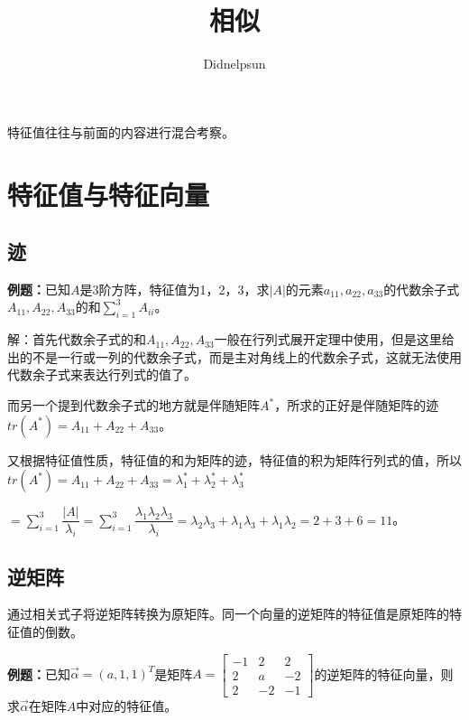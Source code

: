 \documentclass[UTF8, 12pt]{ctexart}
\author{Didnelpsun}
\title{相似}
\date{}
\begin{document}
\maketitle
\pagestyle{empty}
\thispagestyle{empty}
\tableofcontents
\thispagestyle{empty}
\newpage
\pagestyle{plain}
\setcounter{page}{1}

特征值往往与前面的内容进行混合考察。

\section{特征值与特征向量}

\subsection{迹}

\textbf{例题：}已知$A$是3阶方阵，特征值为1，2，3，求$\vert A\vert$的元素$a_{11},a_{22},a_{33}$的代数余子式$A_{11},A_{22},A_{33}$的和$\sum\limits_{i=1}^3A_{ii}$。

解：首先代数余子式的和$A_{11},A_{22},A_{33}$一般在行列式展开定理中使用，但是这里给出的不是一行或一列的代数余子式，而是主对角线上的代数余子式，这就无法使用代数余子式来表达行列式的值了。

而另一个提到代数余子式的地方就是伴随矩阵$A^*$，所求的正好是伴随矩阵的迹$tr(A^*)=A_{11}+A_{22}+A_{33}$。

又根据特征值性质，特征值的和为矩阵的迹，特征值的积为矩阵行列式的值，所以$tr(A^*)=A_{11}+A_{22}+A_{33}=\lambda_1^*+\lambda_2^*+\lambda_3^*$

$=\sum\limits_{i=1}^3\dfrac{\vert A\vert}{\lambda_i}=\sum\limits_{i=1}^3\dfrac{\lambda_1\lambda_2\lambda_3}{\lambda_i}=\lambda_2\lambda_3+\lambda_1\lambda_3+\lambda_1\lambda_2=2+3+6=11$。

\subsection{逆矩阵}

通过相关式子将逆矩阵转换为原矩阵。同一个向量的逆矩阵的特征值是原矩阵的特征值的倒数。

\textbf{例题：}已知$\overrightarrow{\alpha}=(a,1,1)^T$是矩阵$A=\left[\begin{array}{ccc}
    -1 & 2 & 2 \\
    2 & a & -2 \\
    2 & -2 & -1
\end{array}\right]$的逆矩阵的特征向量，则求$\overrightarrow{\alpha}$在矩阵$A$中对应的特征值。
\end{document}
